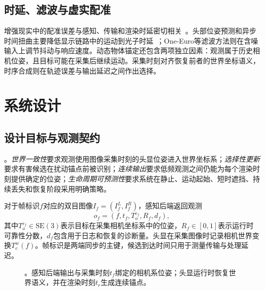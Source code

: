 \documentclass[review]{vgtc}
\newcommand{\system}{EgoAnchor}
\newcommand{\SE}{\mathrm{SE}(3)}
\begin{document}
\subsection{时延、滤波与虚实配准}
增强现实中的配准误差与感知、传输和渲染时延密切相关~\cite{azuma1994improving,diluca2010latency}。头部位姿预测和异步时间扭曲主要降低显示链路中的运动到光子时延~\cite{vanwaveren2016atw}；One-Euro等滤波方法则在含噪输入上调节抖动与响应速度。动态物体锚定还包含两项独立因素：观测属于历史相机位姿，且目标可能在采集后继续运动。采集时刻对齐恢复前者的世界坐标语义，时序合成则在轨迹误差与输出延迟之间作出选择。

\section{系统设计}

\subsection{设计目标与观测契约}
。\emph{世界一致性}要求观测使用图像采集时刻的头显位姿进入世界坐标系；\emph{选择性更新}要求有害候选在扰动锚点前被识别；\emph{连续输出}要求低频观测之间仍能为每个渲染时刻提供确定的位姿；\emph{生命周期可预测性}要求系统在静止、运动起始、短时遮挡、持续丢失和恢复阶段采用明确策略。

对于帧标识$f$对应的双目图像$I_f=(I_f^L,I_f^R)$，感知后端返回观测
\begin{equation}
  o_f = \left(f,t_f,T_o^{c_f},R_f,d_f\right),
\end{equation}
其中$T_o^{c_f}\in\SE$表示目标在采集相机坐标系中的位姿，$R_f\in[0,1]$表示运行时可靠性分数，$d_f$包含用于日志和恢复的诊断量。头显在采集图像时记录相机世界变换$T_c^w(f)$。帧标识是两端同步的主键，候选到达时间只用于测量传输与处理延迟。

\begin{figure}[t]
\centering
{}
\caption{。感知后端输出与采集时刻$t_f$绑定的相机系位姿；头显运行时恢复世界语义，并在渲染时刻$t_r$生成连续锚点。}
\label{fig:pipeline}
\end{figure}
\end{document}
